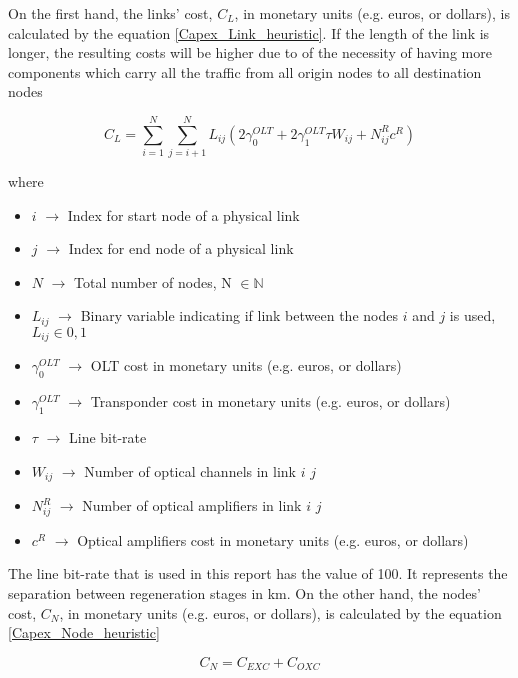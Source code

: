 On the first hand, the links' cost, $C_L$, in monetary units (e.g. euros, or dollars), is calculated by the equation \ref{Capex_Link_heuristic}. If the length of the link is longer, the resulting costs will be higher due to of the necessity of having more components which carry all the traffic from all origin nodes to all destination nodes

\begin{equation}
C_L = \sum_{i=1}^N \sum_{j=i+1}^N L_{ij} \left( 2 \gamma_0^{OLT} + 2 \gamma_1^{OLT} \tau W_{ij} + N^R_{ij} c^R \right)
\label{Capex_Link_heuristic}
\end{equation}

\noindent
where

\begin{itemize}
\item{$i$               $\rightarrow$   Index for start node of a physical link}
\item{$j$               $\rightarrow$   Index for end node of a physical link}
\item{$N$				$\rightarrow$	Total number of nodes, N $\in \mathbb{N}$}
\item{$L_{ij}$			$\rightarrow$	Binary variable indicating if link between the nodes $i$ and $j$ is used, $L_{ij} \in {0, 1}$}
\item{$\gamma_0^{OLT}$	$\rightarrow$	OLT cost in monetary units (e.g. euros, or dollars)}
\item{$\gamma_1^{OLT}$	$\rightarrow$	Transponder cost in monetary units (e.g. euros, or dollars)}
\item{$\tau$		    $\rightarrow$	Line bit-rate}
\item{$W_{ij}$          $\rightarrow$   Number of optical channels in link $i$ $j$}
\item{$N^R_{ij}$    	$\rightarrow$	Number of optical amplifiers in link $i$ $j$}
\item{$c^R$				$\rightarrow$	Optical amplifiers cost in monetary units (e.g. euros, or dollars)}
\end{itemize}

The line bit-rate that is used in this report has the value of 100. It represents the separation between regeneration stages in km. On the other hand, the nodes' cost, $C_N$, in monetary units (e.g. euros, or dollars), is calculated by the equation \ref{Capex_Node_heuristic}

\begin{equation}
C_N = C_{EXC} + C_{OXC}
\label{Capex_Node_heuristic}
\end{equation}

